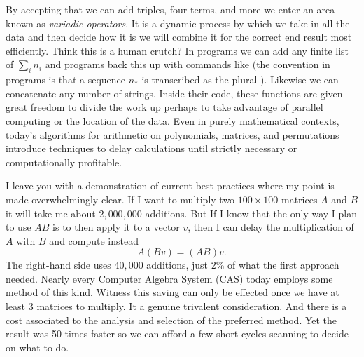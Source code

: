 By accepting that we can add triples, four terms, and more we enter 
an area known as \emph{variadic operators}.  It is a dynamic process
by which we take in all the data and then decide how it is we will combine it
for the correct end result most efficiently.   Think this is a human crutch?
In programs we can add any finite list of $\sum_{i} n_i$ and 
programs back this up with commands like  
(the convention in programs is that a sequence $n_*$ is transcribed as 
the plural ).  Likewise we can concatenate any 
number of strings.  Inside their code, these functions are given great freedom 
to divide the work up perhaps to take advantage of parallel computing 
or the location of the data.  Even in purely mathematical contexts,
today's algorithms for arithmetic on polynomials, matrices, and 
permutations introduce techniques to delay calculations until strictly 
necessary or computationally profitable. 

I leave you with a demonstration of current best practices where my point is 
made overwhelmingly clear.
If I want to multiply two $100\times 100$ matrices $A$ and $B$ it 
will take me about $2,000,000$ additions. But If I know that 
the only way I plan to use $AB$ is to then apply it to a vector $v$,
then I can delay the multiplication of $A$ with $B$ and compute instead
\[
    A(Bv) = (AB)v.
\]
The right-hand side uses $40,000$ additions, just 2\% of what the 
first approach needed.  Nearly every Computer Algebra System (CAS) today 
employs some method of this kind.  
Witness this saving can only be effected once we have at least 3 matrices
to multiply.  It a genuine trivalent consideration.  And there is a cost associated
to the analysis and selection of the preferred method.  Yet the result was 50 times 
faster so we can afford a few short cycles scanning to decide on what to do.



